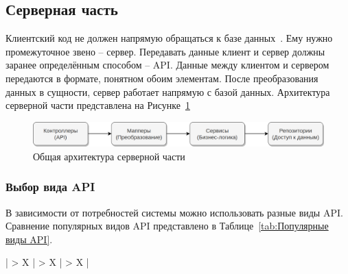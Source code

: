 \documentclass[a4paper,article]{article}
\begin{document}
\begin{sloppypar}
    \newpage

    \subsection{Серверная часть}

    Клиентский код не должен напрямую обращаться к базе данных~\cite{baeldungbook, webapi, cleanarch}. Ему нужно промежуточное звено -- сервер. Передавать данные клиент и сервер должны заранее определённым способом -- API. Данные между клиентом и сервером передаются в формате, понятном обоим элементам. После преобразования данных в сущности, сервер работает напрямую с базой данных. Архитектура серверной части представлена на Рисунке~\ref{fig:Архитектура серверной части}

    \begin{figure}[h]
        \centering
        \includegraphics[width=0.9\linewidth]{Архитектура серверной части.png}
        \caption{\centering Общая архитектура серверной части}
        \label{fig:Архитектура серверной части}
    \end{figure}
    
    \vspace{-2em}

    \subsubsection{Выбор вида API}\label{Выбор вида API}

    В зависимости от потребностей системы можно использовать разные виды API. Сравнение популярных видов API представлено в Таблице~\ref{tab:Популярные виды API}.

    \begin{xltabular}{\textwidth} { |
            >{\hsize} X |
            >{\hsize} X |
            >{\hsize} X | }
        \caption{\centering Популярные виды API}
        \label{tab:Популярные виды API} \\
            

\end{xltabular}
\end{sloppypar}
\end{document}
